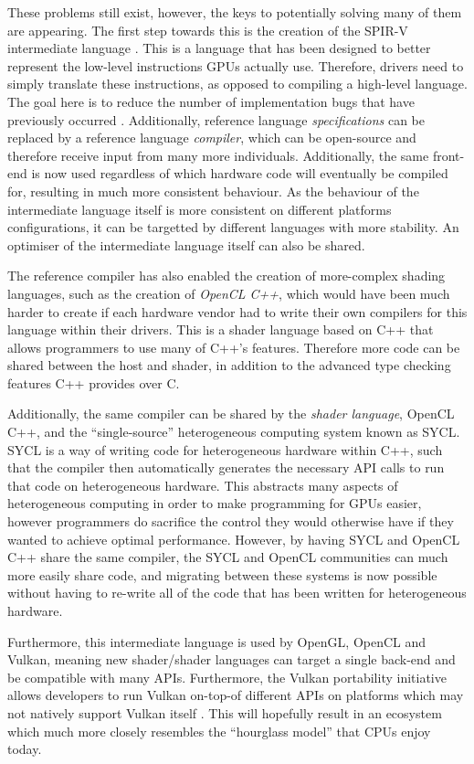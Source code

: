 \documentclass[a4paper,12pt,twoside,openright]{report}
\begin{document}
These problems still exist, however, the keys to potentially solving many of
them are appearing. The first step towards this is the creation of the SPIR-V
intermediate language \cite{SPIRV}. This is a language that has been designed
to better represent the low-level instructions GPUs actually use. Therefore,
drivers need to simply translate these instructions, as opposed to compiling a
high-level language. The goal here is to reduce the number of implementation
bugs that have previously occurred \cite{TODO}. Additionally, reference
language \textit{specifications} can be replaced by a reference language
\textit{compiler}, which can be open-source and therefore receive input from
many more individuals. Additionally, the same front-end is now used regardless
of which hardware code will eventually be compiled for, resulting in much more
consistent behaviour. As the behaviour of the intermediate language itself is
more consistent on different platforms configurations, it can be targetted by
different languages with more stability. An optimiser of the intermediate
language itself can also be shared.

The reference compiler has also enabled the creation of more-complex shading
languages, such as the creation of \textit{OpenCL C++}, which would have been
much harder to create if each hardware vendor had to write their own compilers
for this language within their drivers. This is a shader language based on C++
that allows programmers to use many of C++'s features. Therefore more code can
be shared between the host and shader, in addition to the advanced type
checking features C++ provides over C.

Additionally, the same compiler can be shared by the \textit{shader language},
OpenCL C++, and the ``single-source'' heterogeneous computing system known as
SYCL. SYCL is a way of writing code for heterogeneous hardware within C++, such
that the compiler then automatically generates the necessary API calls to run
that code on heterogeneous hardware. This abstracts many aspects of
heterogeneous computing in order to make programming for GPUs easier, however
programmers do sacrifice the control they would otherwise have if they wanted
to achieve optimal performance. However, by having SYCL and OpenCL C++ share
the same compiler, the SYCL and OpenCL communities can much more easily share
code, and migrating between these systems is now possible without having to
re-write all of the code that has been written for heterogeneous hardware.

Furthermore, this intermediate language is used by OpenGL, OpenCL and Vulkan,
meaning new shader/shader languages can target a single back-end and be
compatible with many APIs. Furthermore, the Vulkan portability initiative
allows developers to run Vulkan on-top-of different APIs on platforms which may
not natively support Vulkan itself \cite{TODO}. This will hopefully result in
an ecosystem which much more closely resembles the ``hourglass model'' that
CPUs enjoy today.
\end{document}
